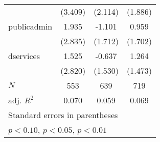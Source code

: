 {\begin{tabular}{l*{3}{c}}
            &     (3.409)         &     (2.114)         &     (1.886)         \\
[1em]
publicadmin &       1.935         &      -1.101         &       0.959         \\
            &     (2.835)         &     (1.712)         &     (1.702)         \\
[1em]
dservices   &       1.525         &      -0.637         &       1.264         \\
            &     (2.820)         &     (1.530)         &     (1.473)         \\
\hline
\(N\)       &         553         &         639         &         719         \\
adj. \(R^{2}\)&       0.070         &       0.059         &       0.069         \\
\hline\hline
\multicolumn{4}{l}{\footnotesize Standard errors in parentheses}\\
\multicolumn{4}{l}{\footnotesize \sym{*} \(p<0.10\), \sym{**} \(p<0.05\), \sym{***} \(p<0.01\)}\\
\end{tabular}
}
